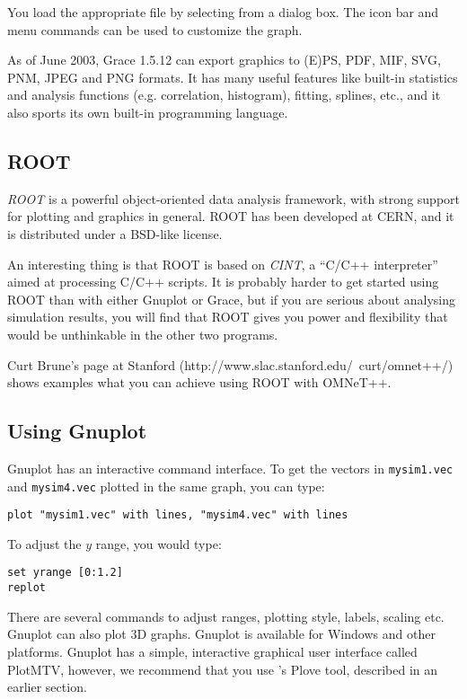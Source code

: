 You load the appropriate file by selecting from a dialog box.
The icon bar and menu commands can be used to customize
the graph.

As of June 2003, Grace 1.5.12 can export graphics to (E)PS, PDF, MIF, SVG,
PNM, JPEG and PNG formats. It has many useful features like built-in statistics
and analysis functions (e.g. correlation, histogram), fitting, splines, etc.,
and it also sports its own built-in programming language.


\subsection{ROOT}

\textit{ROOT} is a powerful object-oriented data analysis framework,
with strong support for plotting and graphics in general.
ROOT has been developed at CERN, and it is distributed under a BSD-like license.

An interesting thing is that ROOT is based on \textit{CINT}, a ``C/C++ interpreter''
aimed at processing C/C++ scripts. It is probably harder to get started
using ROOT than with either Gnuplot or Grace, but if you are serious
about analysing simulation results, you will find that ROOT gives you
power and flexibility that would be unthinkable in the other two programs.

Curt Brune's page at Stanford (http://www.slac.stanford.edu/~curt/omnet++/)
shows examples what you can achieve using ROOT with OMNeT++.


\subsection{Using Gnuplot}

Gnuplot has an interactive command interface. To get the vectors in
\texttt{mysim1.vec} and \texttt{mysim4.vec} plotted in the same graph,
you can type:

\begin{verbatim}
plot "mysim1.vec" with lines, "mysim4.vec" with lines
\end{verbatim}

To adjust the $y$ range, you would type:

\begin{verbatim}
set yrange [0:1.2]
replot
\end{verbatim}


There are several commands to adjust ranges, plotting style, labels,
scaling etc. Gnuplot can also plot 3D graphs. Gnuplot
is available for Windows and other platforms. Gnuplot has a simple, interactive
graphical user interface called PlotMTV, however, we recommend that you use
{\opp}'s Plove tool, described in an earlier section.




